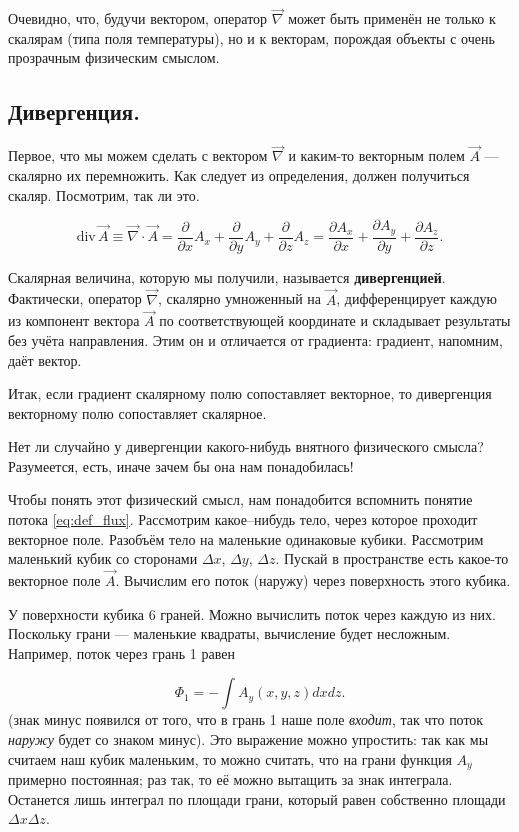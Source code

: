 \documentclass[11pt,a4paper]{article}
\numberwithin{equation}{section}
\newcommand{\pt}{\partial}
\renewcommand{\div}{\mathrm{div}\,}
\begin{document}
Очевидно, что, будучи вектором, оператор $\vec{\nabla}$ может быть применён
не только к скалярам (типа поля температуры), но и к векторам,
порождая объекты с очень прозрачным физическим смыслом. 

\subsection{Дивергенция.}
\label{sec:divergence}

Первое, что мы можем сделать с вектором $\vec{\nabla}$ и каким-то
векторным полем $\vec{A}$ --- скалярно их перемножить. Как следует из
определения, должен получиться скаляр. Посмотрим, так ли это.

\begin{equation}
  \label{eq:def_divergence}
  \div \vec{A} \equiv \vec{\nabla} \cdot \vec{A} = \frac{\pt}{\pt x}
  A_x +  \frac{\pt}{\pt y} A_y +  \frac{\pt}{\pt z} A_z = \frac{\pt
    A_x}{\pt x} +  \frac{\pt A_y}{\pt y} +  \frac{\pt A_z}{\pt z}.
\end{equation}

Скалярная величина, которую мы получили, называется
\textbf{дивергенцией}. Фактически, оператор $\vec{\nabla}$, скалярно
умноженный на $\vec{A}$, дифференцирует каждую из компонент вектора
$\vec{A}$ по соответствующей координате и складывает результаты без
учёта направления. Этим он и отличается от градиента: градиент,
напомним, даёт вектор. 

Итак, если градиент скалярному полю сопоставляет векторное, то
дивергенция векторному полю сопоставляет скалярное. 

Нет ли случайно у дивергенции какого-нибудь внятного физического
смысла? Разумеется, есть, иначе зачем бы она нам понадобилась!

Чтобы понять этот физический смысл, нам понадобится вспомнить понятие
потока \eqref{eq:def_flux}. Рассмотрим какое--нибудь тело, через
которое проходит векторное поле. Разобъём тело на маленькие одинаковые
кубики. Рассмотрим маленький кубик со сторонами $\Delta x$, $\Delta
y$, $\Delta z$. Пускай в пространстве есть какое-то векторное поле
$\vec{A}$. Вычислим его поток (наружу) через поверхность этого кубика.

У поверхности кубика 6 граней. Можно вычислить поток через каждую из
них. Поскольку грани --- маленькие квадраты, вычисление будет
несложным. Например, поток через грань 1 равен

\begin{equation}
  \label{eq:theorem_divergence_1}
  \Phi_1 = -\int A_y (x,y,z) dx dz.
\end{equation}
(знак минус появился от того, что в грань 1 наше поле \emph{входит},
так что поток \emph{наружу} будет со знаком минус). Это выражение
можно упростить: так как мы считаем наш кубик маленьким, то можно
считать, что на грани функция $A_y$ примерно постоянная; раз так, то
её можно вытащить за знак интеграла. Останется лишь интеграл по
площади грани, который равен собственно площади $\Delta x \Delta z$. 
\end{document}
